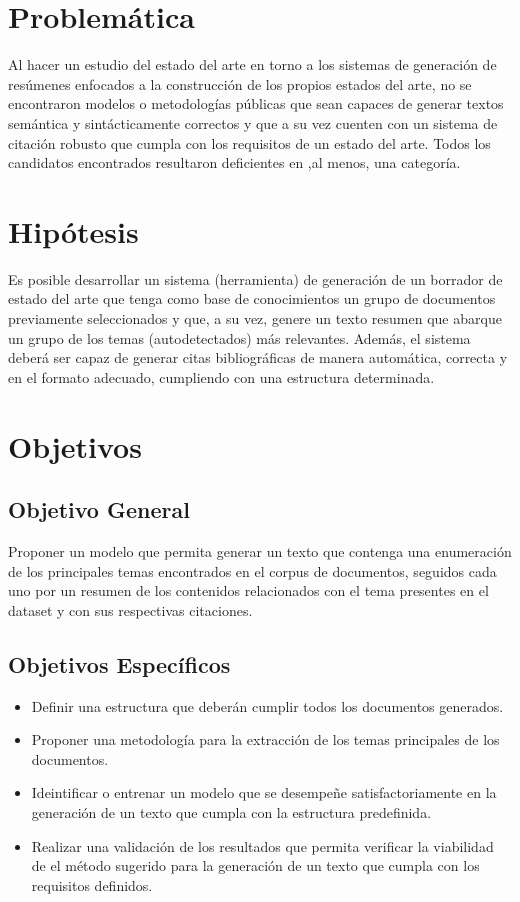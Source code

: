 \section{Problemática}
    Al hacer un estudio del estado del arte en torno a los sistemas de generación de resúmenes enfocados a la construcción de los propios estados del arte, no se encontraron modelos o metodologías públicas que sean capaces de generar textos semántica y sintácticamente correctos y que a su vez cuenten con un sistema de citación robusto que cumpla con los requisitos de un estado del arte. Todos los candidatos encontrados resultaron deficientes en ,al menos, una categoría.

\section{Hipótesis}
    Es posible desarrollar un sistema (herramienta) de generación de un borrador de estado del arte que tenga como base de conocimientos un grupo de documentos previamente seleccionados y que, a su vez, genere un texto resumen que abarque un grupo de los temas (autodetectados) más relevantes. Además, el sistema deberá ser capaz de generar citas bibliográficas de manera automática, correcta y en el formato adecuado, cumpliendo con una estructura determinada.

\section{Objetivos}
    \subsection{Objetivo General}

        Proponer un modelo que permita generar un texto que contenga una enumeración de los principales temas encontrados en el corpus de documentos, seguidos cada uno por un resumen de los contenidos relacionados con el tema presentes en el dataset y con sus respectivas citaciones.

    \subsection{Objetivos Específicos}

        \begin{itemize}
            \item Definir una estructura que deberán cumplir todos los documentos generados.
            \item Proponer una metodología para la extracción de los temas principales de los documentos.
            \item Ideintificar o entrenar un modelo que se desempeñe satisfactoriamente en la generación de un texto que cumpla con la estructura predefinida.
            \item Realizar una validación de los resultados que permita verificar la viabilidad de el método sugerido para la generación de un texto que cumpla con los requisitos definidos.
        \end{itemize}
